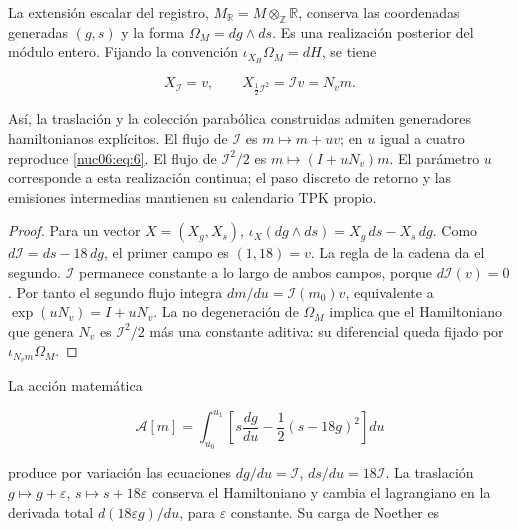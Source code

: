 \begin{theorem}
\label{nuc06:variacional}

La extensión escalar del registro, \(M_{\mathbb R}=M\otimes_{\mathbb Z}\mathbb R\), conserva las coordenadas generadas \((g,s)\) y la forma \(\Omega_M=dg\wedge ds\). Es una realización posterior del módulo entero. Fijando la convención \(\iota_{X_H}\Omega_M=dH\), se tiene

\begin{equation}
X_{\mathcal I}=v,\qquad
X_{\frac12\mathcal I^2}=\mathcal I v=N_vm.
\label{nuc06:eq:12a}
\end{equation}

Así, la traslación y la colección parabólica construidas admiten generadores hamiltonianos explícitos. El flujo de \(\mathcal I\) es \(m\mapsto m+uv\); en \(u\) igual a cuatro reproduce \eqref{nuc06:eq:6}. El flujo de \(\mathcal I^2/2\) es \(m\mapsto(I+uN_v)m\). El parámetro \(u\) corresponde a esta realización continua; el paso discreto de retorno y las emisiones intermedias mantienen su calendario TPK propio.
\end{theorem}

\begin{proof}
Para un vector \(X=(X_g,X_s)\), \(\iota_X(dg\wedge ds)=X_g\,ds-X_s\,dg\). Como \(d\mathcal I=ds-18\,dg\), el primer campo es \((1,18)=v\). La regla de la cadena da el segundo. \(\mathcal I\) permanece constante a lo largo de ambos campos, porque \(d\mathcal I(v)=0\). Por tanto el segundo flujo integra \(dm/du=\mathcal I(m_0)v\), equivalente a \(\exp(uN_v)=I+uN_v\). La no degeneración de \(\Omega_M\) implica que el Hamiltoniano que genera \(N_v\) es \(\mathcal I^2/2\) más una constante aditiva: su diferencial queda fijado por \(\iota_{N_vm}\Omega_M\).
\end{proof}

La acción matemática

\begin{equation}
\mathscr A[m]=\int_{u_0}^{u_1}
\left[s\frac{dg}{du}-\frac12(s-18g)^2\right]du
\label{nuc06:eq:12b}
\end{equation}

produce por variación las ecuaciones \(dg/du=\mathcal I\), \(ds/du=18\mathcal I\). La traslación \(g\mapsto g+\varepsilon\), \(s\mapsto s+18\varepsilon\) conserva el Hamiltoniano y cambia el lagrangiano en la derivada total \(d(18\varepsilon g)/du\), para \(\varepsilon\) constante. Su carga de Noether es

